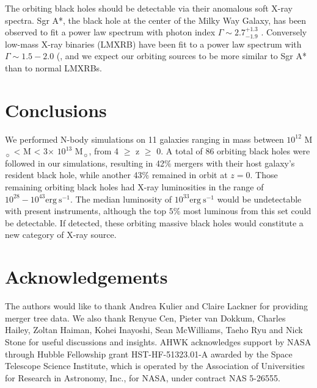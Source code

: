 \documentclass[fleqn,usenatbib,useAMS]{mnras}
\begin{document}
The orbiting black holes should be detectable via their anomalous soft X-ray spectra.  Sgr A*, the black hole at the center of the Milky Way Galaxy, has been observed to fit a power law spectrum with photon index $\Gamma\sim2.7^{+1.3}_{-1.9}$ \citet{2003ApJ...591..891B}.  Conversely low-mass X-ray binaries (LMXRB) have been fit to a power law spectrum with $\Gamma\sim1.5-2.0$ (\citet{2018Natur.556...70H}, and we expect our orbiting sources to be more similar to Sgr A* than to normal LMXRBs.

\section{Conclusions}\label{sec:conclusions}
We performed N-body simulations on 11 galaxies ranging in mass between $10^{12}$ M$_{\sun}$ < M < 3$\times$ $10^{13}$ M$_{\sun}$, from 4 $\geq$ z $\geq$ 0.  A total of 86 orbiting black holes were followed in our simulations, resulting in 42$\%$ mergers with their host galaxy's resident black hole, while another 43$\%$ remained in orbit at $z=0$.  Those remaining orbiting black holes had X-ray luminosities in the range of $10^{28}-10^{43}\mathrm{erg}~\mathrm{s}^{-1}$.  The median luminosity of $10^{33}\mathrm{erg}~\mathrm{s}^{-1}$ would be undetectable with present instruments, although the top $5\%$ most luminous from this set could be detectable.  If detected, these orbiting massive black holes would constitute a new category of X-ray source.

\section{Acknowledgements}
The authors would like to thank Andrea Kulier and Claire Lackner for providing merger tree data. We also thank Renyue Cen, Pieter van Dokkum, Charles Hailey, Zoltan Haiman, Kohei Inayoshi, Sean McWilliams, Taeho Ryu and Nick Stone for useful discussions and insights.  AHWK acknowledges support by NASA through Hubble Fellowship grant HST-HF-51323.01-A awarded by the Space Telescope Science Institute, which is operated by the Association of Universities for Research in Astronomy, Inc., for NASA, under contract NAS 5-26555.








\bsp	%
\label{lastpage}
\end{document}
